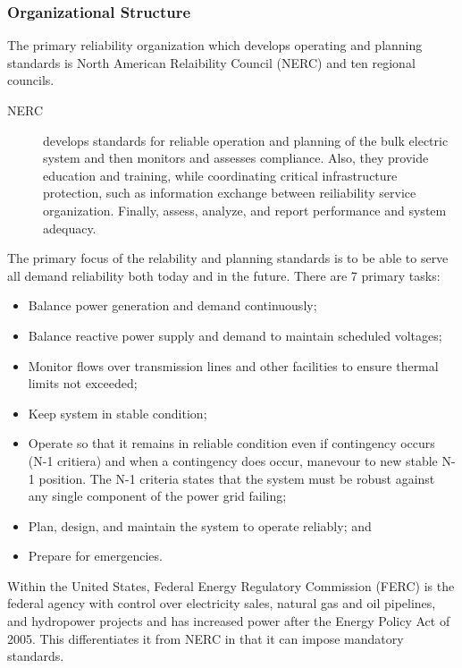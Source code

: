 \subsubsection{Organizational Structure}
The primary reliability organization which develops operating and planning standards is North American Relaibility Council (NERC) and ten regional councils. 
\begin{description}
\item[NERC] develops standards for reliable operation and planning of the bulk electric system and then monitors and assesses compliance.  Also, they provide education and training, while coordinating critical infrastructure protection, such as information exchange between reiliability service organization.  Finally, assess, analyze, and report performance and system adequacy.
\end{description}
 The primary focus of the relability and planning standards is to be able to serve all demand reliability both today and in the future.  There are 7 primary tasks:
\begin{itemize}
\item Balance power generation and demand continuously;
\item Balance reactive power supply and demand to maintain scheduled voltages;
\item Monitor flows over transmission lines and other facilities to ensure thermal limits not exceeded;
\item Keep system in stable condition;
\item Operate so that it remains in reliable condition even if contingency occurs (N-1 critiera) and when a contingency does occur, manevour to new stable N-1 position. The N-1 criteria states that the system must be robust against any single component of the power grid failing;
\item Plan, design, and maintain the system to operate reliably; and
\item Prepare for emergencies.
\end{itemize}

Within the United States, Federal Energy Regulatory Commission (FERC) is the federal agency with control over electricity sales, natural gas and oil pipelines, and hydropower projects and has increased power after the  Energy Policy Act of 2005.  This differentiates it from NERC in that it can impose mandatory standards.

